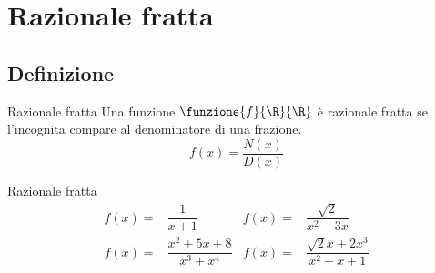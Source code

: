 \section{Razionale fratta}
\subsection{Definizione}
\begin{definizionet}{Razionale fratta}{}
	Una funzione $\funzione{f}{\R}{\R}$ è razionale fratta se l'incognita compare al denominatore di una frazione.
	\[f(x)=\dfrac{N(x)}{D(x)}\]
\end{definizionet}
\begin{esempiot}{Razionale fratta}{}
	\begin{align*}
	f(x)=&\dfrac{1}{x+1}&f(x)=&\dfrac{\sqrt{2}}{x^2-3x}\\
	f(x)=&\dfrac{x^2+5x+8}{x^3+x^4}&f(x)=&\dfrac{\sqrt{2}x+2x^3}{x^2+x+1}
	\end{align*}
\end{esempiot}
